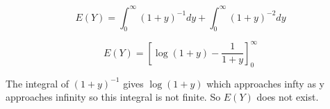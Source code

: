 \documentclass[a4paper,12pt]{article}
\begin{document}
\[E(Y) = \int^{\infty}_{0} (1+y)^{-1} dy  + \int^{\infty}_{0} (1+y)^{-2} dy  \]

\[E(Y) = \left[ \log(1+y) - \frac{1}{1+y} \right]^{\infty}_{0}\]



The integral of $(1 + y)^{-1}$ gives $\log(1 + y)$ which approaches infty as y approaches infinity so this
integral is not finite. So $E(Y)$ does not exist.
\end{document}
